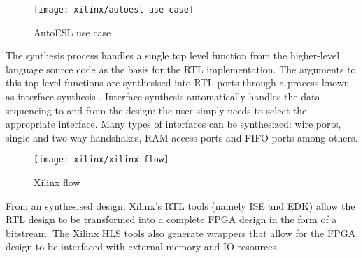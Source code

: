 \begin{figure}
    \centering
    \texttt{[image: xilinx/autoesl-use-case]}
    \caption{AutoESL use case}
    \label{fig:autoesl:useCase}
\end{figure}

The synthesis process handles a single top level function from the higher-level
language source code as the basis for the \gls{RTL} implementation. The
arguments to this top level functions are synthesised into \gls{RTL} ports
through a process known as interface synthesis \cite{Xilinx:CodingStyleGuide}.
Interface synthesis automatically handles the data sequencing to and from the
design: the user simply needs to select the appropriate interface. Many types of
interfaces can be synthesized: wire ports, single and two-way handshakes, RAM
access ports and FIFO ports among others.

\begin{figure}
    \centering
    \texttt{[image: xilinx/xilinx-flow]}
    \caption{Xilinx flow}
    \label{fig:xilinx:flow}
\end{figure}

From an  synthesised design, Xilinx's \gls{RTL} tools (namely
\gls{ISE} and \gls{EDK}) allow the \gls{RTL} design to be transformed into a
complete \gls{FPGA} design in the form of a bitstream. The Xilinx \gls{HLS}
tools also generate wrappers that allow for the \gls{FPGA} design to be
interfaced with external memory and \gls{IO} resources.
